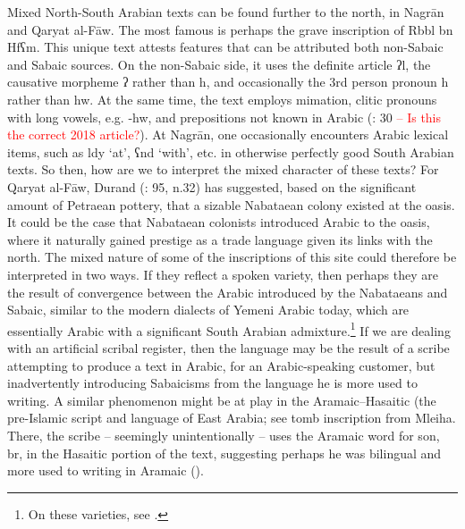\documentclass[output=paper]{langsci/langscibook}
\begin{document}
Mixed North-South Arabian texts can be found further to the north, in Nagrān and Qaryat al-Fāw. The most famous is perhaps the grave inscription of Rbbl bn Hfʕm. This unique text attests features that can be attributed both non-Sabaic and Sabaic sources. On the non-Sabaic side, it uses the definite article ʔl, the causative morpheme ʔ rather than h, and occasionally the 3rd person pronoun h rather than hw. At the same time, the text employs mimation, clitic pronouns with long vowels, e.g. -hw, and prepositions not known in Arabic (\citealt{Al-Jallad2018ANA}: 30 \textcolor{red}{-- Is this the correct 2018 article?}). At Nagrān, one occasionally encounters Arabic lexical items, such as ldy ‘at’, ʕnd ‘with’, etc. in otherwise perfectly good South Arabian texts. So then, how are we to interpret the mixed character of these texts? For Qaryat al-Fāw, Durand (\citet{Durand2017}: 95, n.32) has suggested, based on the significant amount of Petraean pottery, that a sizable Nabataean colony existed at the oasis. It could be the case that Nabataean colonists introduced Arabic to the oasis, where it naturally gained prestige as a trade language given its links with the north. The mixed nature of some of the inscriptions of this site could therefore be interpreted in two ways. If they reflect a spoken variety, then perhaps they are the result of convergence between the Arabic introduced by the Nabataeans and Sabaic, similar to the modern dialects of Yemeni Arabic today, which are essentially Arabic with a significant South Arabian admixture.\footnote{On these varieties, see \citep{Watson2018}.}   If we are dealing with an artificial scribal register, then the language may be the result of a scribe attempting to produce a text in Arabic, for an Arabic-speaking customer, but inadvertently introducing Sabaicisms from the language he is more used to writing. A similar phenomenon might be at play in the Aramaic–Hasaitic (the pre-Islamic script and language of East Arabia; see  tomb inscription from Mleiha. There, the scribe – seemingly unintentionally – uses the Aramaic word for son, br, in the Hasaitic portion of the text, suggesting perhaps he was bilingual and more used to writing in Aramaic (\citet{Overlaetetal2016}).
\end{document}
